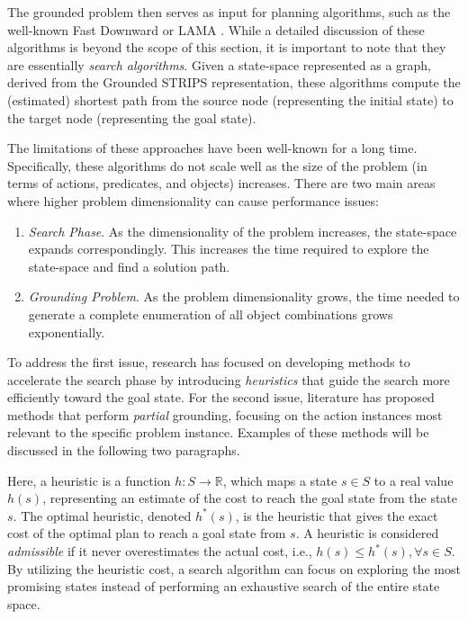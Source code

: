The grounded problem then serves as input for planning algorithms, such as the well-known Fast Downward \cite{helmert2006fast} or LAMA \cite{richter2010lama}. While a detailed discussion of these algorithms is beyond the scope of this section, it is important to note that they are essentially \textit{search algorithms}. Given a state-space represented as a graph, derived from the Grounded STRIPS representation, these algorithms compute the (estimated) shortest path from the source node (representing the initial state) to the target node (representing the goal state).

The limitations of these approaches have been well-known for a long time. Specifically, these algorithms do not scale well as the size of the problem (in terms of actions, predicates, and objects) increases. There are two main areas where higher problem dimensionality can cause performance issues:

\begin{enumerate}
    \item \textit{Search Phase}. As the dimensionality of the problem increases, the state-space expands correspondingly. This increases the time required to explore the state-space and find a solution path.
    \item \textit{Grounding Problem}. As the problem dimensionality grows, the time needed to generate a complete enumeration of all object combinations grows exponentially.
\end{enumerate}

To address the first issue, research has focused on developing methods to accelerate the search phase by introducing \textit{heuristics} that guide the search more efficiently toward the goal state. For the second issue, literature has proposed methods that perform \textit{partial} grounding, focusing on the action instances most relevant to the specific problem instance. Examples of these methods will be discussed in the following two paragraphs.

Here, a heuristic is a function $h: S \rightarrow \mathbb{R}$, which maps a state $s \in S$ to a real value $h(s)$, representing an estimate of the cost to reach the goal state from the state $s$. The optimal heuristic, denoted $h^{*}(s)$, is the heuristic that gives the exact cost of the optimal plan to reach a goal state from $s$. A heuristic is considered \textit{admissible} if it never overestimates the actual cost, i.e., $h(s) \leq h^{*}(s), \forall s \in S$. By utilizing the heuristic cost, a search algorithm can focus on exploring the most promising states instead of performing an exhaustive search of the entire state space.

